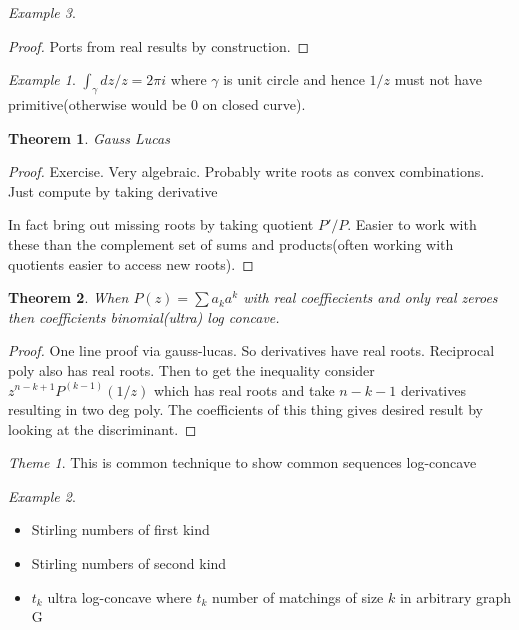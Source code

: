 \documentclass[11pt]{article}
\newtheorem{theorem}{Theorem}
\theoremstyle{remark}
\newtheorem{theme}{Theme}
\newtheorem{example}{Example}
\begin{document}
\begin{example}
\begin{proof}
	Ports from real results by construction.
\end{proof}

\begin{example}
	$\int_{\gamma} dz/z=2\pi i$ where $\gamma$ is unit circle and hence $1/z$ must not have primitive(otherwise would be 0 on closed curve).
\end{example}

\begin{theorem}
	Gauss Lucas
\end{theorem}

\begin{proof}
	Exercise. Very algebraic. Probably write roots as convex combinations. Just compute by taking derivative

	In fact bring out missing roots by taking quotient $P'/P$. Easier to work with these than the complement set of sums and products(often working with quotients easier to access new roots).
\end{proof}

\begin{theorem}
	When $P(z) = \sum a_k a^k$ with real coeffiecients and only real zeroes then coefficients binomial(ultra) log concave.
\end{theorem}

\begin{proof}
	One line proof via gauss-lucas. So derivatives have real roots. Reciprocal poly also has real roots. Then to get the inequality consider $z^{n-k+1}P^{(k-1)}(1/z)$ which has real roots and take $n-k-1$ derivatives resulting in two deg poly. The coefficients of this thing gives desired result by looking at the discriminant.
\end{proof}

\begin{theme}
	This is common technique to show common sequences log-concave
\end{theme}

\begin{example}
	\begin{itemize}
		\item Stirling numbers of first kind
		\item Stirling numbers of second kind
		\item $t_k$ ultra log-concave where $t_k$ number of matchings of size $k$ in arbitrary graph G
	\end{itemize}
\end{example}


\end{example}
\end{document}
